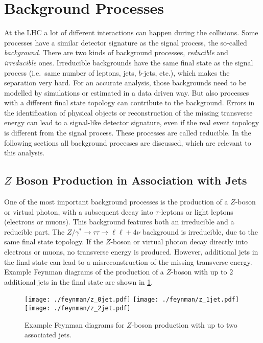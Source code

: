 \section{Background Processes}\label{sec:processes:background}

At the LHC a lot of different interactions can happen during the collisions.
Some processes have a similar detector signature as the signal process, the so-called \emph{background}.
There are two kinds of background processes, \emph{reducible} and \emph{irreducible} ones.
Irreducible backgrounds have the same final state as the signal process (i.e.\ same number of leptons, jets, $b$-jets, etc.), which makes the separation very hard.
For an accurate analysis, those backgrounds need to be modelled by simulations or estimated in a data driven way.
But also processes with a different final state topology can contribute to the background.
Errors in the identification of physical objects or reconstruction of the missing transverse energy can lead
to a signal-like detector signature, even if the real event topology is different from the signal process.
These processes are called reducible.
In the following sections all background processes are discussed, which are relevant to this analysis.

\subsection{$Z$ Boson Production in Association with Jets}\label{sub:processes:z}

One of the most important background processes is the production of a $Z$-boson or
virtual photon, with a subsequent decay into $\tau$-leptons or light leptons (electrons or muons).
This background features both an irreducible and a reducible part.
The $Z / \gamma^* \to \tau\tau \to \ell\ell + 4 \nu$ background is irreducible, due to the same final state topology.
If the $Z$-boson or virtual photon decay directly into electrons or muons, no transverse energy is produced.
However, additional jets in the final state can lead to a misreconstruction of the missing transverse energy.
Example Feynman diagrams of the production of a $Z$-boson with up to $2$ additional jets in the final state are
shown in \cref{fig:processes:z}.

\begin{figure}[htb]
    \centering
    \texttt{[image: ./feynman/z\_0jet.pdf]}
    \texttt{[image: ./feynman/z\_1jet.pdf]}
    \texttt{[image: ./feynman/z\_2jet.pdf]}
    \caption{Example Feynman diagrams for $Z$-boson production with up to two associated jets.}\label{fig:processes:z}
\end{figure}

